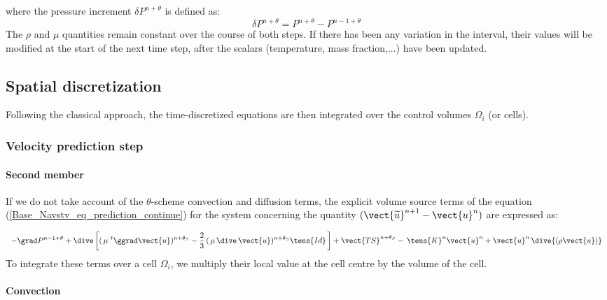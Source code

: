 where the pressure increment $\delta P^{n+\theta}$ is defined as:
\begin{equation}
\delta P^{n+\theta}=P^{n+\theta}-P^{n-1+\theta}
\end{equation}
The  $\rho$ and $\mu$ quantities remain constant over the course of both
steps. If there has been any variation in the interval, their values will be modified at the start of the next time step, after the scalars (temperature, mass fraction,...) have been updated.

\subsection*{\bf Spatial discretization}
Following the classical approach, the time-discretized equations are then integrated over the control volumes ${\Omega_i}$ (or cells).
\subsubsection*{\bf Velocity prediction step}
\paragraph{\bf Second member\\ }
If we do not take account of the $\theta$-scheme convection and diffusion
terms, the explicit volume source terms of the equation (\ref{Base_Navstv_eq_prediction_continue})
for the system concerning the quantity $(\vect{\widetilde{u}}^{n+1}-\vect {u}^{n})$
	are expressed as:

\begin{equation}\notag
\begin{array}{c}
\displaystyle
 -\grad P^{n-1+\theta} + \dive \left[ (\,\mu\,\,^{t}\ggrad\vect{u})^{n+\theta_{S}}- \frac{2}{3}\,(\,\mu\, \dive\,\vect{u})^{n+\theta_{S}}\tens{Id} \,\right]+\vect{TS}^{n+\theta_{S}}- \,\tens{K}^{n} \vect{u}^{n}+\vect{u}^{n}\,\dive{(\rho\vect{u})}\\
\end{array}
\end{equation}
To integrate these terms over a cell ${\Omega_i}$, we multiply their local value
at the cell centre by the volume of the cell.

\paragraph{\bf Convection  \\}

